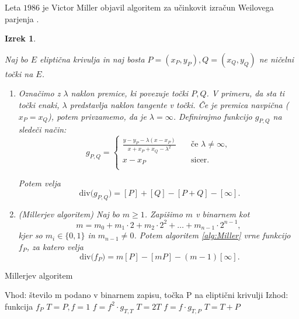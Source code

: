 \documentclass[12pt,a4paper,twoside]{article}
\theoremstyle{definition} %
\theoremstyle{plain} %
\newtheorem{izrek}[definicija]{Izrek}
\numberwithin{equation}{section}  %
\newcommand{\Div}[1]{\ \text{div(}{#1}\text{)}}
\begin{document}
Leta $1986$ je Victor Miller objavil algoritem za učinkovit izračun Weilovega parjenja \cite{Miller} .

\begin{izrek}~

\label{izrek:Miller}

Naj bo $E$ eliptična krivulja in naj bosta $P=(x_P,y_P), Q = (x_Q,y_Q)$ ne ničelni točki na $E$.
\begin{enumerate}
\item Označimo z $\lambda$ naklon premice, ki povezuje točki $P,Q$. V primeru, da sta ti točki enaki, $\lambda$ predstavlja naklon tangente v točki. Če je premica navpična ($x_P = x_Q$), potem privzamemo, da je $\lambda = \infty$. Definirajmo funkcijo $g_{P,Q}$ na sledeči način:
\[ g_{P,Q} =
\begin{cases}
\frac{y-y_P-\lambda(x-x_P)}{x+x_P+x_Q-\lambda^2} & \quad \text{če } \lambda \neq \infty ,\\
x-x_P & \quad \text{sicer} .\\
\end{cases}
\]

Potem velja 
$$\Div{g_{P,Q}} = [P] + [Q] - [P+Q] - [\infty].$$


\item (Millerjev algoritem) Naj bo $m \geq 1$. Zapišimo $m$ v binarnem kot
$$m = m_0+m_1\cdot 2 + m_2\cdot 2^2 + \ldots + m_{n-1}\cdot 2^{n-1},$$
kjer so $m_i \in \{ 0,1 \}$ in $m_{n-1} \neq 0$. Potem algoritem \ref{alg:Miller} vrne
funkcijo $f_P$, za katero velja
$$\Div{f_P} = m[P]-[mP]-(m-1)[\infty].$$ 


\end{enumerate}


\end{izrek}

\begin{algorithm}[H]
\caption[Miller]{Millerjev algoritem}
\label{alg:Miller}

\begin{algorithmic}
\State Vhod: število m podano v binarnem zapisu, točka P na eliptični krivulji
\State Izhod: funkcija $f_P$
\State $T = P,f = 1$
	\State $f = f^2 \cdot g_{T,T}$
	\State $T = 2T$
		\State $f = f \cdot g_{T,P}$
		\State $T=T+P$
	\EndIf
	
\EndFor

\end{algorithmic}
\end{algorithm}
\end{document}
